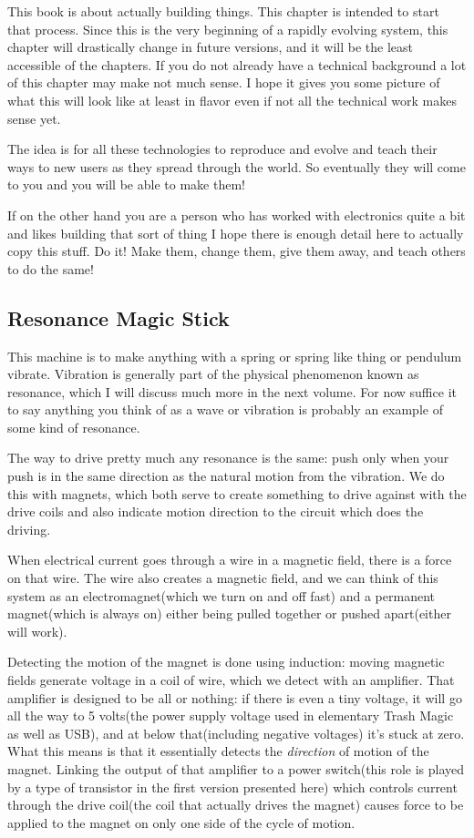 This book is about actually building things. This chapter is intended to
start that process. Since this is the very beginning of a rapidly
evolving system, this chapter will drastically change in future
versions, and it will be the least accessible of the chapters. If you do
not already have a technical background a lot of this chapter may make
not much sense. I hope it gives you some picture of what this will look
like at least in flavor even if not all the technical work makes sense
yet.

The idea is for all these technologies to reproduce and evolve and teach
their ways to new users as they spread through the world. So eventually
they will come to you and you will be able to make them!

If on the other hand you are a person who has worked with electronics
quite a bit and likes building that sort of thing I hope there is enough
detail here to actually copy this stuff. Do it! Make them, change them,
give them away, and teach others to do the same!

\subsection{Resonance Magic Stick}\label{resonance-magic-stick}

This machine is to make anything with a spring or spring like thing or
pendulum vibrate. Vibration is generally part of the physical phenomenon
known as resonance, which I will discuss much more in the next volume.
For now suffice it to say anything you think of as a wave or vibration
is probably an example of some kind of resonance.

The way to drive pretty much any resonance is the same: push only when
your push is in the same direction as the natural motion from the
vibration. We do this with magnets, which both serve to create something
to drive against with the drive coils and also indicate motion direction
to the circuit which does the driving.

When electrical current goes through a wire in a magnetic field, there
is a force on that wire. The wire also creates a magnetic field, and we
can think of this system as an electromagnet(which we turn on and off
fast) and a permanent magnet(which is always on) either being pulled
together or pushed apart(either will work).

Detecting the motion of the magnet is done using induction: moving
magnetic fields generate voltage in a coil of wire, which we detect with
an amplifier. That amplifier is designed to be all or nothing: if there
is even a tiny voltage, it will go all the way to 5 volts(the power
supply voltage used in elementary Trash Magic as well as USB), and at
below that(including negative voltages) it's stuck at zero. What this
means is that it essentially detects the \emph{direction} of motion of
the magnet. Linking the output of that amplifier to a power switch(this
role is played by a type of transistor in the first version presented
here) which controls current through the drive coil(the coil that
actually drives the magnet) causes force to be applied to the magnet on
only one side of the cycle of motion.

